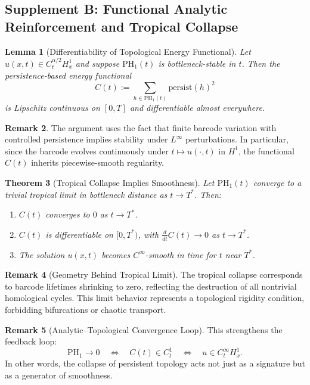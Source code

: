 \documentclass[11pt]{article}
\newtheorem{theorem}{Theorem}[section]
\newtheorem{lemma}[theorem]{Lemma}
\theoremstyle{definition}
\newtheorem{remark}[theorem]{Remark}
\begin{document}
\subsection*{Supplement B: Functional Analytic Reinforcement and Tropical Collapse}

\begin{lemma}[Differentiability of Topological Energy Functional]
\label{lem:Ct_differentiable}
Let $u(x,t) \in C^{\alpha/2}_t H^1_x$ and suppose $\mathrm{PH}_1(t)$ is bottleneck-stable in $t$. Then the persistence-based energy functional
\[
C(t) := \sum_{h \in \mathrm{PH}_1(t)} \mathrm{persist}(h)^2
\]
is Lipschitz continuous on $[0,T]$ and differentiable almost everywhere.
\end{lemma}

\begin{remark}
The argument uses the fact that finite barcode variation with controlled persistence implies stability under $L^\infty$ perturbations. In particular, since the barcode evolves continuously under $t \mapsto u(\cdot,t)$ in $H^1$, the functional $C(t)$ inherits piecewise-smooth regularity.
\end{remark}

\begin{theorem}[Tropical Collapse Implies Smoothness]
Let $\mathrm{PH}_1(t)$ converge to a trivial tropical limit in bottleneck distance as $t \to T^*$. Then:
\begin{enumerate}
  \item $C(t)$ converges to $0$ as $t \to T^*$.
  \item $C(t)$ is differentiable on $[0,T^*)$, with $\frac{d}{dt} C(t) \to 0$ as $t \to T^*$.
  \item The solution $u(x,t)$ becomes $C^\infty$-smooth in time for $t$ near $T^*$.
\end{enumerate}
\end{theorem}

\begin{remark}[Geometry Behind Tropical Limit]
The tropical collapse corresponds to barcode lifetimes shrinking to zero, reflecting the destruction of all nontrivial homological cycles. This limit behavior represents a topological rigidity condition, forbidding bifurcations or chaotic transport.
\end{remark}

\begin{remark}[Analytic–Topological Convergence Loop]
This strengthens the feedback loop:
\[
\mathrm{PH}_1 \to 0 \quad \Longleftrightarrow \quad C(t) \in C^1_t \quad \Longleftrightarrow \quad u \in C^\infty_t H^1_x.
\]
In other words, the collapse of persistent topology acts not just as a signature but as a generator of smoothness.
\end{remark}
\end{document}
